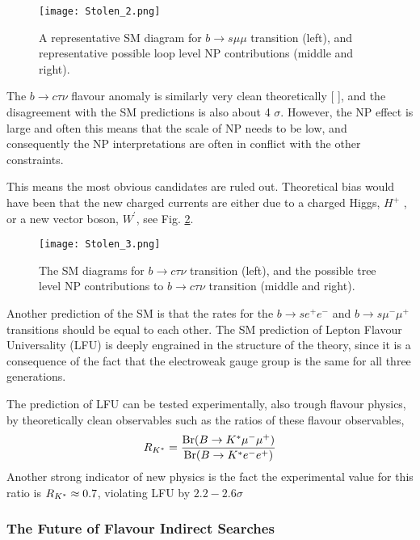 \begin{figure}[H]
	\centering
	\texttt{[image: Stolen\_2.png]}
	\caption{A representative SM diagram for $b \rightarrow s \mu \mu$ transition (left), and representative possible loop level NP
contributions (middle and right).}
	\label{fig:FlavourMuon}
\end{figure}

The $b \rightarrow c \tau \nu$ flavour anomaly is similarly very clean theoretically [
], and the disagreement with the
SM predictions is also about 4 $\sigma$. However, the NP effect is large and often this means that the scale of NP needs to be low, and consequently the NP interpretations are often in conflict with the other constraints.

This means the most obvious candidates are ruled out. Theoretical bias would have been that the new charged currents are either due to a charged Higgs, $H^+$ , or a new vector boson, $W^\prime$, see Fig. \ref{fig:FlavourTau}.

\begin{figure}[H]	
	\centering
	\texttt{[image: Stolen\_3.png]}
	\caption{The SM diagrams for $b \rightarrow c \tau \nu$ transition (left), and the possible tree level NP contributions to $b \rightarrow c \tau \nu$ transition (middle and right).}
	\label{fig:FlavourTau}
\end{figure}

Another prediction of the SM is that the rates for the  $b \rightarrow s e^+ e^-$ and  $b \rightarrow s \mu^- \mu^+$ transitions should be equal to each other. The SM prediction of Lepton Flavour Universality (LFU) is deeply engrained in the structure of the theory, since it is a consequence of the fact that the electroweak gauge group is the same for all three generations. 

The prediction of LFU can be tested experimentally, also trough flavour physics, by theoretically clean observables such as the ratios of these flavour observables, 
%
\begin{equation}
R_{K^{\**}} = \frac{\text{Br}( B \rightarrow K^{\**} \mu^- \mu^+ )}{\text{Br} (  B \rightarrow K^{\**} e^- e^+  )}
\end{equation}
% 
Another strong indicator of new physics is the fact the experimental value for this ratio is $R_{K^{\**}} \approx 0.7$, violating LFU by $2.2 - 2.6 \sigma$

\subsubsection{The Future of Flavour Indirect Searches}

